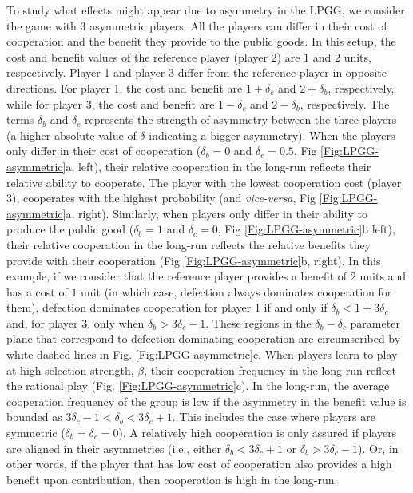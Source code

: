 \documentclass[11pt]{article}
\theoremstyle{plainCl1}
\theoremstyle{plainCl2}
\begin{document}
\noindent 
To study what effects might appear due to asymmetry in the LPGG, we consider the game with $3$ asymmetric players. All the players can differ in their cost of cooperation and the benefit they provide to the public goods. In this setup, the cost and benefit values of the reference player (player 2) are $1$ and $2$ units, respectively. Player 1 and player 3 differ from the reference player in opposite directions. For player 1, the cost and benefit are $1 + \delta_c$ and $2 + \delta_b$, respectively, while for player 3, the cost and benefit are $1 - \delta_c$ and $2 - \delta_b$, respectively. The terms $\delta_b$ and $\delta_c$ represents the strength of asymmetry between the three players (a higher absolute value of $\delta$ indicating a bigger asymmetry). When the players only differ in their cost of cooperation ($\delta_b = 0$ and $\delta_c = 0.5$, Fig \ref{Fig:LPGG-asymmetric}a, left), their relative cooperation in the long-run reflects their relative ability to cooperate. The player with the lowest cooperation cost (player 3), cooperates with the highest probability (and \emph{vice-versa},  Fig \ref{Fig:LPGG-asymmetric}a, right). Similarly, when players only differ in their ability to produce the public good ($\delta_b = 1$ and $\delta_c = 0$, Fig \ref{Fig:LPGG-asymmetric}b left), their relative cooperation in the long-run reflects the relative benefits they provide with their cooperation (Fig \ref{Fig:LPGG-asymmetric}b, right). In this example, if we consider that the reference player provides a benefit of $2$ units and has a cost of $1$ unit (in which case, defection always dominates cooperation for them), defection dominates cooperation for player 1 if and only if $\delta_b < 1 + 3\delta_c$ and, for player 3, only when $\delta_b > 3\delta_c - 1$. These regions in the $\delta_b-\delta_c$ parameter plane that correspond to defection dominating cooperation are circumscribed by white dashed lines in Fig. \ref{Fig:LPGG-asymmetric}c. When players learn to play at high selection strength, $\beta$, their cooperation frequency in the long-run reflect the rational play (Fig. \ref{Fig:LPGG-asymmetric}c). In the long-run, the average cooperation frequency of the group is low if the asymmetry in the benefit value is bounded as $3\delta_c - 1 < \delta_b < 3\delta_c + 1$. This includes the case where players are symmetric ($\delta_b = \delta_c = 0$). A relatively high cooperation is only assured if players are aligned in their asymmetries (i.e., either $\delta_b < 3\delta_c +1$ or $\delta_b > 3\delta_c - 1$). Or, in other words, if the player that has low cost of cooperation also provides a high benefit upon contribution, then cooperation is high in the long-run. 
\end{document}
